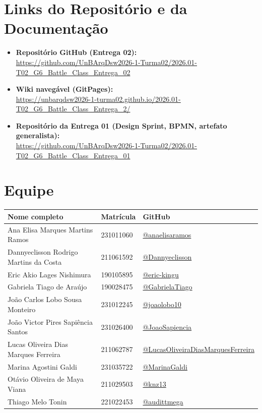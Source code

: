 \documentclass[11pt,a4paper]{article}
\begin{document}
\section{Links do Repositório e da Documentação}

\begin{itemize}[leftmargin=1.4em]
  \item \textbf{Repositório GitHub (Entrega 02):} \\ \url{https://github.com/UnBArqDsw2026-1-Turma02/2026.01-T02_G6_Battle_Class_Entrega_02}
  \item \textbf{Wiki navegável (GitPages):} \\ \url{https://unbarqdsw2026-1-turma02.github.io/2026.01-T02_G6_Battle_Class_Entrega_2/}
  \item \textbf{Repositório da Entrega 01 (Design Sprint, BPMN, artefato generalista):} \\ \url{https://github.com/UnBArqDsw2026-1-Turma02/2026.01-T02_G6_Battle_Class_Entrega_01}
\end{itemize}

\section{Equipe}

\renewcommand{\arraystretch}{1.25}
\begin{longtable}{|p{6.3cm}|p{2.2cm}|p{5.5cm}|}
\hline
\rowcolor{bcBlue!15}
\textbf{Nome completo} & \textbf{Matrícula} & \textbf{GitHub} \\
\hline
\endhead
Ana Elisa Marques Martins Ramos        & 231011060 & \href{https://github.com/anaelisaramos}{@anaelisaramos} \\ \hline
Dannyeclisson Rodrigo Martins da Costa & 211061592 & \href{https://github.com/Dannyeclisson}{@Dannyeclisson} \\ \hline
Eric Akio Lages Nishimura              & 190105895 & \href{https://github.com/eric-kingu}{@eric-kingu} \\ \hline
Gabriela Tiago de Araújo               & 190028475 & \href{https://github.com/GabrielaTiago}{@GabrielaTiago} \\ \hline
João Carlos Lobo Sousa Monteiro        & 231012245 & \href{https://github.com/joaolobo10}{@joaolobo10} \\ \hline
João Victor Pires Sapiência Santos     & 231026400 & \href{https://github.com/JoaoSapiencia}{@JoaoSapiencia} \\ \hline
Lucas Oliveira Dias Marques Ferreira   & 211062787 & \href{https://github.com/LucasOliveiraDiasMarquesFerreira}{@LucasOliveiraDiasMarquesFerreira} \\ \hline
Marina Agostini Galdi                  & 231035722 & \href{https://github.com/MarinaGaldi}{@MarinaGaldi} \\ \hline
Otávio Oliveira de Maya Viana          & 211029503 & \href{https://github.com/knz13}{@knz13} \\ \hline
Thiago Melo Tonin                      & 221022453 & \href{https://github.com/audittmega}{@audittmega} \\ \hline
\end{longtable}
\end{document}
